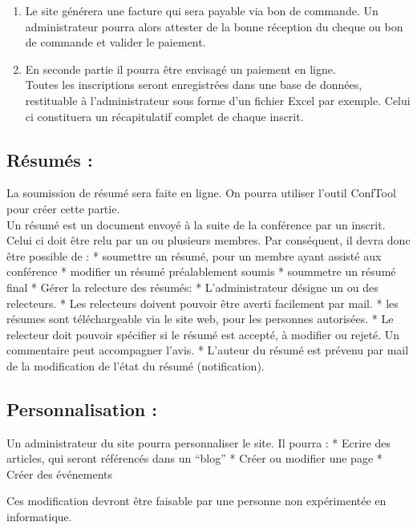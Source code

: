 \documentclass[]{article}
\begin{document}
\begin{enumerate}
\def\labelenumi{\arabic{enumi}.}
\itemsep1pt\parskip0pt
\item
  Le site générera une facture qui sera payable via bon de commande. Un
  administrateur pourra alors attester de la bonne réception du cheque
  ou bon de commande et valider le paiement.
\item
  En seconde partie il pourra être envisagé un paiement en
  ligne.\\Toutes les inscriptions seront enregistrées dans une base de
  données, restituable à l'administrateur sous forme d'un fichier Excel
  par exemple. Celui ci constituera un récapitulatif complet de chaque
  inscrit.
\end{enumerate}

\subsection{Résumés :}\label{ruxe9sumuxe9s}

La soumission de résumé sera faite en ligne. On pourra utiliser l'outil
ConfTool pour créer cette partie.\\Un résumé est un document envoyé à la
suite de la conférence par un inscrit. Celui ci doit être relu par un ou
plusieurs membres. Par conséquent, il devra donc être possible de : *
soumettre un résumé, pour un membre ayant assisté aux conférence *
modifier un résumé préalablement soumis * soummetre un résumé final *
Gérer la relecture des résumés: * L'administrateur désigne un ou des
relecteurs. * Les relecteurs doivent pouvoir être averti facilement par
mail. * les résumes sont téléchargeable via le site web, pour les
personnes autorisées. * Le relecteur doit pouvoir spécifier si le résumé
est accepté, à modifier ou rejeté. Un commentaire peut accompagner
l'avis. * L'auteur du résumé est prévenu par mail de la modification de
l'état du résumé (notification).

\subsection{Personnalisation :}\label{personnalisation}

Un administrateur du site pourra personnaliser le site. Il pourra : *
Ecrire des articles, qui seront référencés dans un ``blog'' * Créer ou
modifier une page * Créer des événements

Ces modification devront être faisable par une personne non expérimentée
en informatique.
\end{document}
